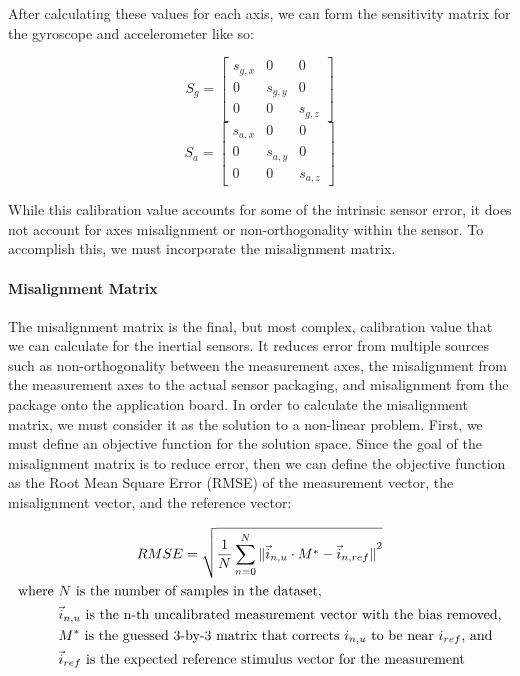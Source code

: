 After calculating these values for each axis, we can form the sensitivity matrix for the gyroscope and accelerometer like so:

\begin{equation*}
    S_g = 
    \begin{bmatrix}
        s_{g,x} & 0 & 0 \\
        0 & s_{g,y} & 0 \\
        0 & 0 & s_{g,z}
    \end{bmatrix} 
\end{equation*}
\begin{equation*}
    S_a =
    \begin{bmatrix}
        s_{a,x} & 0 & 0 \\
        0 & s_{a,y} & 0 \\
        0 & 0 & s_{a,z}
    \end{bmatrix}
\end{equation*}

While this calibration value accounts for some of the intrinsic sensor error, it does not account for axes misalignment or non-orthogonality within the sensor. To accomplish this, we must incorporate the misalignment matrix.

\paragraph*{Misalignment Matrix}

The misalignment matrix is the final, but most complex, calibration value that we can calculate for the inertial sensors. It reduces error from multiple sources such as non-orthogonality between the measurement axes, the misalignment from the measurement axes to the actual sensor packaging, and misalignment from the package onto the application board. In order to calculate the misalignment matrix, we must consider it as the solution to a non-linear problem. First, we must define an objective function for the solution space. Since the goal of the misalignment matrix is to reduce error, then we can define the objective function as the Root Mean Square Error (RMSE) of the measurement vector, the misalignment vector, and the reference vector:

\begin{gather}
    RMSE = \sqrt{\frac{1}{N}\sum_{n=0}^N{\|{\vec{i}_{n,u} \cdot M^* -\vec{i}_{n,ref}\|}^2}} \\
    \begin{aligned}
        \text{where } & N \text{ is the number of samples in the dataset,} \\
        & \vec{i}_{n,u} \text{ is the n-th uncalibrated measurement vector with the bias removed,} \\
        & M^* \text{ is the guessed 3-by-3 matrix that corrects $i_{n,u}$ to be near $i_{ref}$, and } \\
        & \vec{i}_{ref} \text{ is the expected reference stimulus vector for the measurement}
    \end{aligned} \notag
\end{gather}

